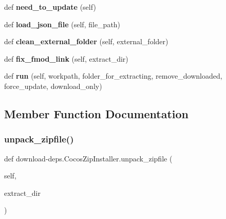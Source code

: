 \begin{DoxyCompactItemize}
\item 
\mbox{\label{classdownload-deps_1_1CocosZipInstaller_a8b8689321cb33939af201db41bb40135}} 
def {\bfseries need\+\_\+to\+\_\+update} (self)
\item 
\mbox{\label{classdownload-deps_1_1CocosZipInstaller_a96f1cf87391a76b4b15359ee3cb8e9f4}} 
def {\bfseries load\+\_\+json\+\_\+file} (self, file\+\_\+path)
\item 
\mbox{\label{classdownload-deps_1_1CocosZipInstaller_aaa2509f8baffed17e7411f656f6d8d0e}} 
def {\bfseries clean\+\_\+external\+\_\+folder} (self, external\+\_\+folder)
\item 
\mbox{\label{classdownload-deps_1_1CocosZipInstaller_a30f4be6c25b758ce5eaeee80d25811f4}} 
def {\bfseries fix\+\_\+fmod\+\_\+link} (self, extract\+\_\+dir)
\item 
\mbox{\label{classdownload-deps_1_1CocosZipInstaller_ab1c41b592e5ab5b4add271e71a29cb0d}} 
def {\bfseries run} (self, workpath, folder\+\_\+for\+\_\+extracting, remove\+\_\+downloaded, force\+\_\+update, download\+\_\+only)
\end{DoxyCompactItemize}


\subsection{Member Function Documentation}
\mbox{\label{classdownload-deps_1_1CocosZipInstaller_a93043957b5e9244249c31fd67636d3e6}} 
\subsubsection{\texorpdfstring{unpack\+\_\+zipfile()}{unpack\_zipfile()}\hspace{0.1cm}{\footnotesize\ttfamily [1/2]}}
{\footnotesize\ttfamily def download-\/deps.\+Cocos\+Zip\+Installer.\+unpack\+\_\+zipfile (\begin{DoxyParamCaption}\item[{}]{self,  }\item[{}]{extract\+\_\+dir }\end{DoxyParamCaption})}

